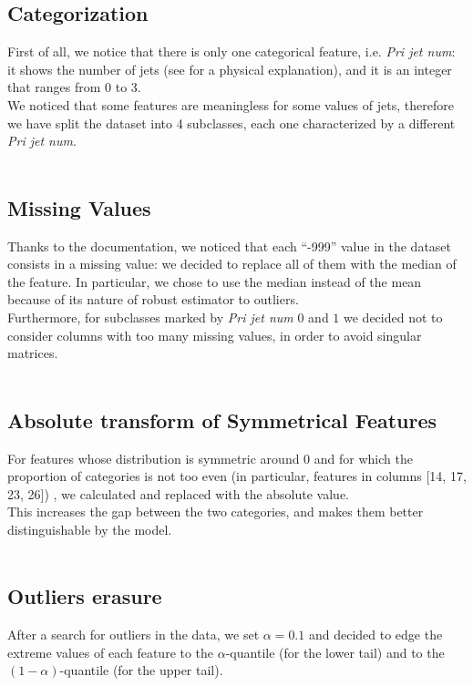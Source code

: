 \documentclass[10pt,conference,compsocconf]{IEEEtran}
\begin{document}
\subsection{Categorization}
First of all, we notice that there is only one categorical feature, i.e. \textit{Pri jet num}: it shows the number of jets (see \cite{higgs} for a physical explanation), and it is an integer that ranges from 0 to 3. \\
We noticed that some features are meaningless for some values of jets, therefore we have split the dataset into 4 subclasses, each one characterized by a different \textit{Pri jet num}.\\
\vspace{-0.8cm}\\

\subsection{Missing Values}
Thanks to the documentation, we noticed that each “-999” value
in the dataset consists in a missing value: we decided to replace all of them with the median of the feature. In particular, we chose to use the median instead of the mean because of its nature of robust estimator to outliers.\\
Furthermore, for subclasses marked by \textit{Pri jet num} $0$ and $1$ we decided not to consider columns with too many missing values, in order to avoid singular matrices.\\
\vspace{-0.8cm}\\

\subsection{Absolute transform of Symmetrical Features}
For features whose distribution is symmetric around 0 and
for which the proportion of categories is not too even (in particular, features in columns [14, 17, 23, 26]) , we calculated and replaced with the absolute value.\\
This increases the gap between the two categories, and makes them better distinguishable by the model. \\
\vspace{-0.8cm}\\

\subsection{Outliers erasure}
After a search for outliers in the data, we set $\alpha = 0.1$ and decided to edge the extreme values of each feature to the $\alpha$-quantile (for the lower tail) and to the $(1-\alpha)$-quantile (for the upper tail).\\
\vspace{-0.8cm}\\
\end{document}
